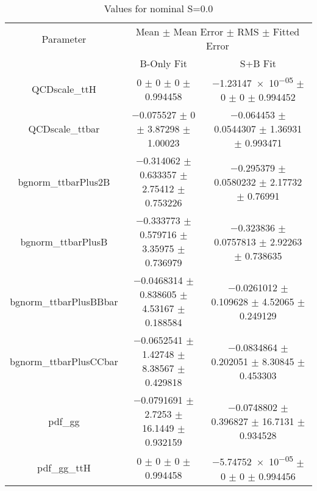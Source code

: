 \begin{table}
\centering
\caption{Values for nominal S=0.0}
\begin{tabular}{ccc}
\toprule
Parameter & \multicolumn{2}{c}{Mean $\pm$ Mean Error $\pm$ RMS $\pm$ Fitted Error}\\
 & B-Only Fit & S+B Fit\\
\midrule
QCDscale\_ttH & \num{0} $\pm$ \num{0} $\pm$ \num{0} $\pm$ \num{0.994458} & \num{-1.23147e-05} $\pm$ \num{0} $\pm$ \num{0} $\pm$ \num{0.994452}\\
QCDscale\_ttbar & \num{-0.075527} $\pm$ \num{0} $\pm$ \num{3.87298} $\pm$ \num{1.00023} & \num{-0.064453} $\pm$ \num{0.0544307} $\pm$ \num{1.36931} $\pm$ \num{0.993471}\\
bgnorm\_ttbarPlus2B & \num{-0.314062} $\pm$ \num{0.633357} $\pm$ \num{2.75412} $\pm$ \num{0.753226} & \num{-0.295379} $\pm$ \num{0.0580232} $\pm$ \num{2.17732} $\pm$ \num{0.76991}\\
bgnorm\_ttbarPlusB & \num{-0.333773} $\pm$ \num{0.579716} $\pm$ \num{3.35975} $\pm$ \num{0.736979} & \num{-0.323836} $\pm$ \num{0.0757813} $\pm$ \num{2.92263} $\pm$ \num{0.738635}\\
bgnorm\_ttbarPlusBBbar & \num{-0.0468314} $\pm$ \num{0.838605} $\pm$ \num{4.53167} $\pm$ \num{0.188584} & \num{-0.0261012} $\pm$ \num{0.109628} $\pm$ \num{4.52065} $\pm$ \num{0.249129}\\
bgnorm\_ttbarPlusCCbar & \num{-0.0652541} $\pm$ \num{1.42748} $\pm$ \num{8.38567} $\pm$ \num{0.429818} & \num{-0.0834864} $\pm$ \num{0.202051} $\pm$ \num{8.30845} $\pm$ \num{0.453303}\\
pdf\_gg & \num{-0.0791691} $\pm$ \num{2.7253} $\pm$ \num{16.1449} $\pm$ \num{0.932159} & \num{-0.0748802} $\pm$ \num{0.396827} $\pm$ \num{16.7131} $\pm$ \num{0.934528}\\
pdf\_gg\_ttH & \num{0} $\pm$ \num{0} $\pm$ \num{0} $\pm$ \num{0.994458} & \num{-5.74752e-05} $\pm$ \num{0} $\pm$ \num{0} $\pm$ \num{0.994456}\\
\bottomrule
\end{tabular}
\end{table}